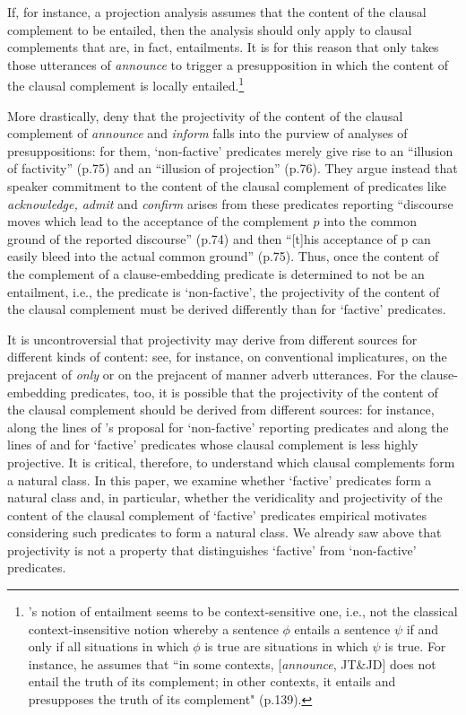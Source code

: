 \documentclass[11pt,fleqn]{article}
\newcommand{\6}{\mbox{$[\hspace*{-.6mm}[$}}
\newcommand{\9}{\mbox{$]\hspace*{-.6mm}]$}}
\newcommand{\citepos}[1]{\citeauthor{#1}'s \citeyear{#1}}
\begin{document}
{\begin{itemize}
If, for instance, a projection analysis assumes that the content of the clausal complement to be entailed, then the analysis should only apply to  clausal complements that are, in fact, entailments. It is for this reason that \citet{schlenker10} only takes those utterances of {\em announce} to trigger a presupposition in which the content of the clausal complement is locally entailed.\footnote{\citepos{schlenker10} notion of entailment seems to be context-sensitive one, i.e., not the classical context-insensitive notion whereby a sentence $\phi$ entails a sentence $\psi$ if and only if all situations in which $\phi$ is true are situations in which $\psi$ is true. For instance, he assumes that ``in some contexts, [{\em announce}, JT\&JD] does not entail the truth of its complement; in other contexts, it entails and presupposes the truth of its complement" (p.139).} 

More drastically, \citet{anand-hacquard2014} deny that the projectivity of the content of the clausal complement of {\em announce} and {\em inform} falls into the purview of analyses of presuppositions: for them,  `non-factive' predicates merely give rise to an ``illusion of factivity'' (p.75) and an ``illusion of projection'' (p.76). They argue instead that speaker commitment to the content of the clausal complement of predicates like {\em acknowledge, admit} and {\em confirm} arises from these predicates reporting ``discourse moves which lead to the acceptance of the complement $p$ into the common ground of the reported discourse'' (p.74) and then ``[t]his acceptance of p can easily bleed into the actual common ground'' (p.75). Thus, once the content of the complement of a clause-embedding predicate is determined to not be an entailment, i.e., the predicate is `non-factive', the projectivity of the content of the clausal complement must be derived differently than for `factive' predicates.

It is uncontroversial that projectivity may derive from different sources for different kinds of content: see, for instance, \citealt{potts05} on conventional implicatures, \citealt{beaver-clark08} on the prejacent of {\em only} or \citealt{abrusan2013} on the prejacent of manner adverb utterances.  For the clause-embedding predicates, too, it is possible that the projectivity of the content of the clausal complement should be derived from different sources: for instance, along the lines of \citepos{anand-hacquard2014} proposal for `non-factive' reporting predicates and along the lines of \citealt{abusch10,abrusan2011} and \citealt{romoli2015} for `factive' predicates whose clausal complement is less highly projective. It is critical, therefore, to understand which clausal complements form a natural class. In this paper, we examine whether `factive' predicates form a natural class and, in particular, whether the veridicality and projectivity of the content of the clausal complement of `factive' predicates empirical motivates considering such predicates to form a natural class. We already saw above that projectivity is not a property that distinguishes `factive' from `non-factive' predicates. 


\end{itemize}}
\end{document}

